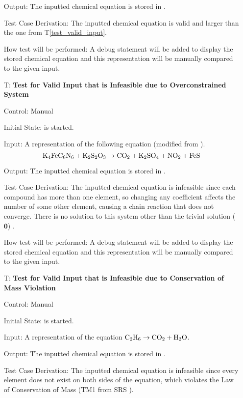 \documentclass[12pt, titlepage]{article}
\newcounter{testnum} %
\newcommand{\testref}[1]{T\ref{#1}}
\begin{document}
\begin{enumerate}
    Output: The inputted chemical equation is stored in \progname{}.

    Test Case Derivation: The inputted chemical equation is
    valid and larger than the one from \testref{test_valid_input}.

    How test will be performed: A debug statement will be added to display the
    stored chemical equation and this representation will be manually compared to
    the given input.

  \item[T\refstepcounter{testnum}\thetestnum \label{test_inf_over_valid_input}:]
    \textbf{Test for Valid Input that is Infeasible due to Overconstrained
      System}

    Control: Manual

    Initial State: \progname{} is started.

    Input: A representation of the following equation (modified from
    \cite{hamid_balancing_2019}).
    $$\ce{K4FeC6N6} + \ce{K2S2O3} \rightarrow \ce{CO2} + \ce{K2SO4} + \ce{NO2} +
      \ce{FeS}$$

    Output: The inputted chemical equation is stored in \progname{}.

    Test Case Derivation: The inputted chemical equation is infeasible since
    each compound has more than one element, so changing any coefficient
    affects the number of some other element, causing a chain reaction that
    does not converge. There is no solution to this system other than the
    trivial solution ($\mathbf{0}$) \cite{hamid_balancing_2019}.

    How test will be performed: A debug statement will be added to display the
    stored chemical equation and this representation will be manually compared to
    the given input.

  \item[T\refstepcounter{testnum}\thetestnum \label{test_inf_cons_mass_valid_input}:]
    \textbf{Test for Valid Input that is Infeasible due to Conservation of Mass
      Violation}

    Control: Manual

    Initial State: \progname{} is started.

    Input: A representation of the equation
    $\ce{C2H6} \rightarrow \ce{CO2} + \ce{H2O}$.

    Output: The inputted chemical equation is stored in \progname{}.

    Test Case Derivation: The inputted chemical equation is infeasible since
    every element does not exist on both sides of the equation, which violates
    the Law of Conservation of Mass (TM1 from SRS ).


\end{enumerate}
\end{document}
